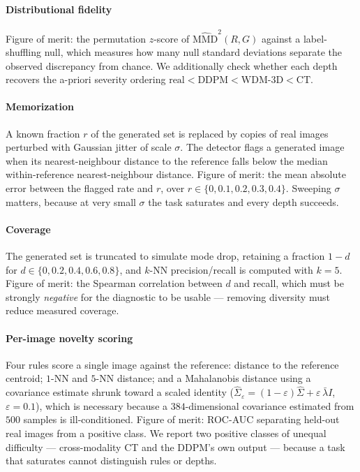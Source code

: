 \documentclass[preprint,12pt,authoryear]{elsarticle}
\newcommand{\mmd}{\mathrm{MMD}}
\begin{document}
\paragraph{Distributional fidelity}
Figure of merit: the permutation $z$-score of $\widehat{\mmd}^2(R, G)$ against a
label-shuffling null, which measures how many null standard deviations separate
the observed discrepancy from chance. We additionally check whether each depth
recovers the a-priori severity ordering
$\text{real} < \text{DDPM} < \text{WDM-3D} < \text{CT}$.

\paragraph{Memorization}
A known fraction $r$ of the generated set is replaced by copies of real images
perturbed with Gaussian jitter of scale $\sigma$. The detector flags a generated
image when its nearest-neighbour distance to the reference falls below the
median within-reference nearest-neighbour distance. Figure of merit: the mean
absolute error between the flagged rate and $r$, over
$r \in \{0, 0.1, 0.2, 0.3, 0.4\}$. Sweeping $\sigma$ matters, because at very
small $\sigma$ the task saturates and every depth succeeds.

\paragraph{Coverage}
The generated set is truncated to simulate mode drop, retaining a fraction
$1-d$ for $d \in \{0, 0.2, 0.4, 0.6, 0.8\}$, and $k$-NN precision/recall
\citep{kynkaanniemi2019pr} is computed with $k=5$. Figure of merit: the
Spearman correlation between $d$ and recall, which must be strongly
\emph{negative} for the diagnostic to be usable --- removing diversity must
reduce measured coverage.

\paragraph{Per-image novelty scoring}
Four rules score a single image against the reference: distance to the
reference centroid; $1$-NN and $5$-NN distance; and a Mahalanobis distance using
a covariance estimate shrunk toward a scaled identity
($\hat\Sigma_\varepsilon = (1-\varepsilon)\hat\Sigma + \varepsilon\,\bar\lambda I$,
$\varepsilon = 0.1$), which is necessary because a $384$-dimensional covariance
estimated from $500$ samples is ill-conditioned. Figure of merit: ROC-AUC
separating held-out real images from a positive class. We report two positive
classes of unequal difficulty --- cross-modality CT and the DDPM's own output ---
because a task that saturates cannot distinguish rules or depths.
\end{document}
